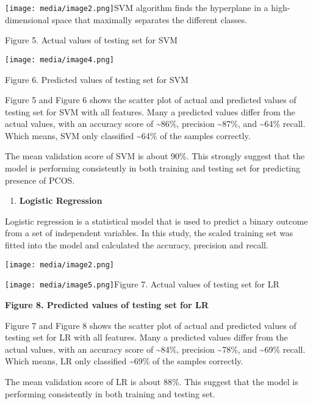 \documentclass[
]{article}
\begin{document}
\texttt{[image: media/image2.png]}SVM
algorithm finds the hyperplane in a high-dimensional space that
maximally separates the different classes.

Figure 5. Actual values of testing set for SVM

\texttt{[image: media/image4.png]}

Figure 6. Predicted values of testing set for SVM

Figure 5 and Figure 6 shows the scatter plot of actual and predicted
values of testing set for SVM with all features. Many a predicted values
differ from the actual values, with an accuracy score of
\textasciitilde86\%, precision \textasciitilde87\%, and
\textasciitilde64\% recall. Which means, SVM only classified
\textasciitilde64\% of the samples correctly.

The mean validation score of SVM is about 90\%. This strongly suggest
that the model is performing consistently in both training and testing
set for predicting presence of PCOS.

\begin{enumerate}
\def\labelenumi{\alph{enumi})}
\setcounter{enumi}{2}
\item
  \textbf{Logistic Regression}
\end{enumerate}

Logistic regression is a statistical model that is used to predict a
binary outcome from a set of independent variables. In this study, the
scaled training set was fitted into the model and calculated the
accuracy, precision and recall.

\texttt{[image: media/image2.png]}

\texttt{[image: media/image5.png]}Figure
7. Actual values of testing set for LR

\textbf{Figure 8. Predicted values of testing set for LR}

Figure 7 and Figure 8 shows the scatter plot of actual and predicted
values of testing set for LR with all features. Many a predicted values
differ from the actual values, with an accuracy score of
\textasciitilde84\%, precision \textasciitilde78\%, and
\textasciitilde69\% recall. Which means, LR only classified
\textasciitilde69\% of the samples correctly.

The mean validation score of LR is about 88\%. This suggest that the
model is performing consistently in both training and testing set.
\end{document}
